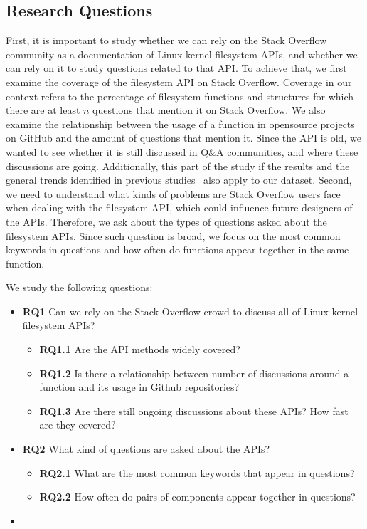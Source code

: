 \subsection{Research Questions}\label{subsec:rq}
First, it is important to study whether we can rely on the Stack Overflow community as a documentation of Linux kernel filesystem APIs, and whether we can rely on it to study questions related to that API. To achieve that, we first examine the coverage of the filesystem API on Stack Overflow. Coverage in our context refers to the percentage of filesystem functions and structures for which there are at least $n$ questions that mention it on Stack Overflow. We also examine the relationship between the usage of a function in opensource projects on GitHub and the amount of questions that mention it. Since the API is old, we wanted to see whether it is still discussed in Q\&A communities, and where these discussions are going. Additionally, this part of the study if the results and the general trends identified in previous studies~\cite{Parnin2012CrowdDE} also apply to our dataset.
Second, we need to understand what kinds of problems are Stack Overflow users face when dealing with the filesystem API, which could influence future designers of the APIs. Therefore, we ask about the types of questions asked about the filesystem APIs. Since such question is broad, we focus on the most common keywords in questions and how often do functions appear together in the same function.

We study the following questions:
\begin{itemize}
  \item
  \textbf{RQ1} Can we rely on the Stack Overflow crowd to discuss all of Linux kernel filesystem APIs?
  \begin{itemize}
    \item
    \textbf{RQ1.1} Are the API methods widely covered?
    \item
    \textbf{RQ1.2} Is there a relationship between number of discussions around a function and its usage in Github repositories?
    \item
    \textbf{RQ1.3} Are there still ongoing discussions about these APIs? How fast are they covered?
  \end{itemize}
  \item
  \textbf{RQ2} What kind of questions are asked about the APIs?
  \begin{itemize}
    \item
    \textbf{RQ2.1} What are the most common keywords that appear in questions?
    \item
    \textbf{RQ2.2} How often do pairs of components appear together in questions?
  \end{itemize}
  \item
\end{itemize}

